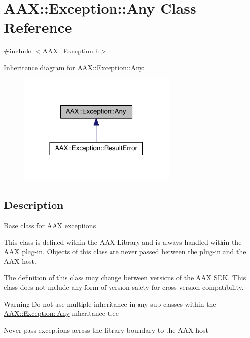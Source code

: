 \hypertarget{a00143}{}\section{A\+A\+X\+:\+:Exception\+:\+:Any Class Reference}
\label{a00143}


{\ttfamily \#include $<$A\+A\+X\+\_\+\+Exception.\+h$>$}



Inheritance diagram for A\+A\+X\+:\+:Exception\+:\+:Any\+:
\nopagebreak
\begin{figure}[H]
\begin{center}
\leavevmode
\includegraphics[width=222pt]{a00731}
\end{center}
\end{figure}


\subsection{Description}
Base class for A\+A\+X exceptions

This class is defined within the A\+A\+X Library and is always handled within the A\+A\+X plug-\/in. Objects of this class are never passed between the plug-\/in and the A\+A\+X host.

The definition of this class may change between versions of the A\+A\+X S\+D\+K. This class does not include any form of version safety for cross-\/version compatibility.

\begin{DoxyWarning}{Warning}
Do not use multiple inheritance in any sub-\/classes within the \hyperlink{a00143}{A\+A\+X\+::\+Exception\+::\+Any} inheritance tree

Never pass exceptions across the library boundary to the A\+A\+X host 
\end{DoxyWarning}
